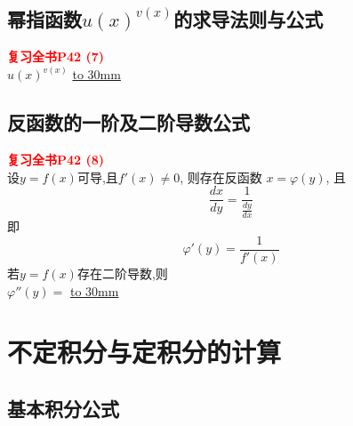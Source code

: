 \documentclass[a4paper]{ctexart}
\begin{document}
\subsection{幂指函数$u(x)^{v(x)}$的求导法则与公式}
    \textcolor{red}{\textbf{复习全书P42 \quad (7)}}\\
    $u(x)^{v(x)}$
        \underline{\hbox to 30mm{}}     \\

\subsection{反函数的一阶及二阶导数公式}
    \textcolor{red}{\textbf{复习全书P42 \quad (8)}}\\
设$y=f(x)$可导,且$f'(x)\neq 0$, 则存在反函数 $x=\varphi (y)$, 且\\
$$
\frac{dx}{dy} = 
    \frac{1}{
        \frac{dy}{dx}
        } $$
即\\
$$
\varphi'(y) = \frac{1}{f'(x)}
$$
若$y=f(x)$存在二阶导数,则\\
$ \varphi''(y) = $
        \underline{\hbox to 30mm{}}     \\

\section{不定积分与定积分的计算}
\subsection{基本积分公式}
\end{document}
